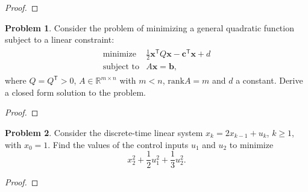 \documentclass[12pt]{article}
\theoremstyle{definition}
\newtheorem{problem}{Problem}
\newcommand{\vc}[1]{\boldsymbol{#1}}
\newcommand{\tran}{\mathsf{T}}
\begin{document}
\begin{proof}
\end{proof}
\newpage


\begin{problem}
  Consider the problem of minimizing a general quadratic function subject to a linear constraint:
  \begin{align*}
    \begin{array}{rl}
      \text{minimize} & \frac{1}{2} \vc{x}^\tran Q \vc{x} - \vc{c}^\tran \vc{x} + d\\
      \text{subject to} & A\vc{x} = \vc{b},
    \end{array}
  \end{align*}
  where $Q=Q^\tran > 0$, $A \in\mathbb{R}^{m \times n}$ with $m<n$, $\text{rank} A = m$ and $d$ a constant.
  Derive a closed form solution to the problem.
\end{problem}

\begin{proof}
\end{proof}
\newpage


\begin{problem}
  Consider the discrete-time linear system $x_k = 2 x_{k-1} + u_k$, $k \geq 1$, with
  $x_0 = 1$. Find the values of the control inputs $u_1$ and $u_2$ to minimize
  $$x_2^2 + \frac{1}{2}u_1^2+ \frac{1}{3}u_2^2.$$
\end{problem}

\begin{proof}
\end{proof}
\end{document}
